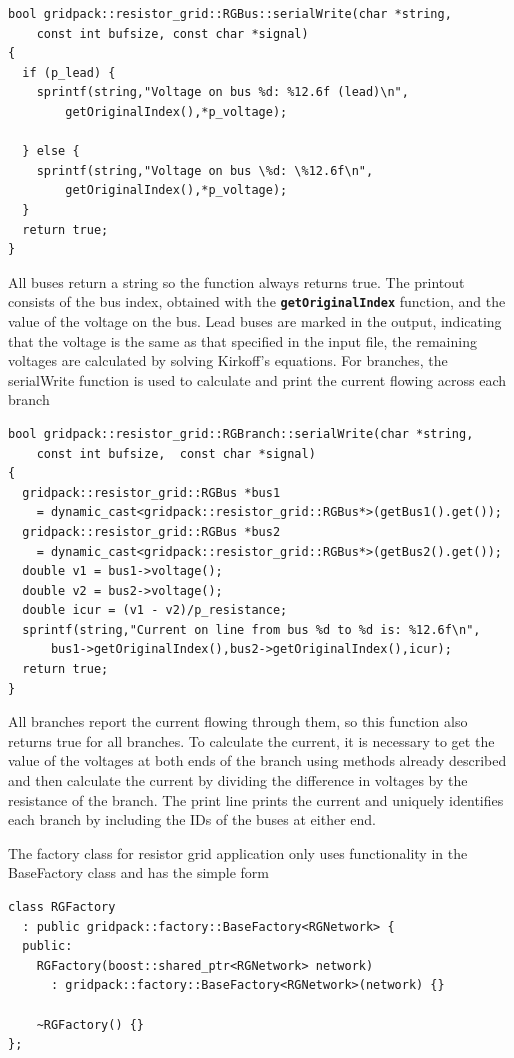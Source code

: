 \documentclass[12pt]{report} %
\begin{document}
{
\color{red}
\begin{Verbatim}[fontseries=b]
bool gridpack::resistor_grid::RGBus::serialWrite(char *string,
    const int bufsize, const char *signal)
{
  if (p_lead) {
    sprintf(string,"Voltage on bus %d: %12.6f (lead)\n",
        getOriginalIndex(),*p_voltage);

  } else {
    sprintf(string,"Voltage on bus \%d: \%12.6f\n",
        getOriginalIndex(),*p_voltage);
  }
  return true;
}
\end{Verbatim}
}

All buses return a string so the function always returns true. The printout consists of the bus index, obtained with the \texttt{\textbf{getOriginalIndex}} function, and the value of the voltage on the bus. Lead buses are marked in the output, indicating that the voltage is the same as that specified in the input file, the remaining voltages are calculated by solving Kirkoff's equations. For branches, the serialWrite function is used to calculate and print the current flowing across each branch

{
\color{red}
\begin{Verbatim}[fontseries=b]
bool gridpack::resistor_grid::RGBranch::serialWrite(char *string,
    const int bufsize,  const char *signal)
{
  gridpack::resistor_grid::RGBus *bus1
    = dynamic_cast<gridpack::resistor_grid::RGBus*>(getBus1().get());
  gridpack::resistor_grid::RGBus *bus2
    = dynamic_cast<gridpack::resistor_grid::RGBus*>(getBus2().get());
  double v1 = bus1->voltage();
  double v2 = bus2->voltage();
  double icur = (v1 - v2)/p_resistance;
  sprintf(string,"Current on line from bus %d to %d is: %12.6f\n",
      bus1->getOriginalIndex(),bus2->getOriginalIndex(),icur);
  return true;
}
\end{Verbatim}
}

All branches report the current flowing through them, so this function also returns true for all branches. To calculate the current, it is necessary to get the value of the voltages at both ends of the branch using methods already described and then calculate the current by dividing the difference in voltages by the resistance of the branch. The print line prints the current and uniquely identifies each branch by including the IDs of the buses at either end.

The factory class for resistor grid application only uses functionality in the BaseFactory class and has the simple form

{
\color{red}
\begin{Verbatim}[fontseries=b]
class RGFactory
  : public gridpack::factory::BaseFactory<RGNetwork> {
  public:
    RGFactory(boost::shared_ptr<RGNetwork> network)
      : gridpack::factory::BaseFactory<RGNetwork>(network) {}

    ~RGFactory() {}
};
\end{Verbatim}
}
\end{document}
